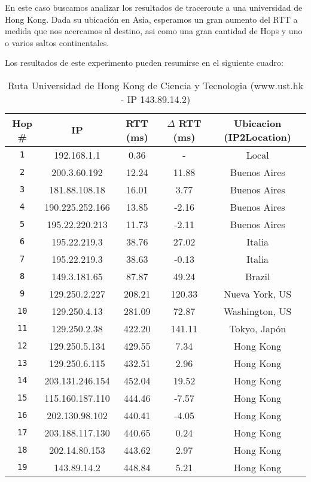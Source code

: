 En este caso buscamos analizar los resultados de traceroute a una universidad de Hong Kong. Dada su ubicación en Asia, esperamos un gran aumento del RTT a medida que nos acercamos al destino, asi como una gran cantidad de Hops y uno o varios saltos continentales.

Los resultados de este experimento pueden resumirse en el siguiente cuadro:

\begin{table}[ht]\begin{center}
    \begin{tabular}{|c|c|c|c|c|}
    \hline
    \textbf{Hop \#} & \textbf{IP} & \textbf{RTT (ms)} & \textbf{$\Delta$ RTT (ms)} & \textbf{Ubicacion (IP2Location)} \\ \hline
    \texttt{1} &  192.168.1.1 & 0.36        &  -        & Local \\ \hline
    \texttt{2} &  200.3.60.192 & 12.24      & 11.88     & Buenos Aires \\ \hline
    \texttt{3} &  181.88.108.18 & 16.01     & 3.77      & Buenos Aires \\ \hline
    \texttt{4} &  190.225.252.166 & 13.85   & -2.16     & Buenos Aires \\ \hline
    \texttt{5} &  195.22.220.213 & 11.73    & -2.11     & Buenos Aires \\ \hline
    \texttt{6} &  195.22.219.3 & 38.76      & 27.02     & Italia \\ \hline
    \texttt{7} &  195.22.219.3 & 38.63      & -0.13     & Italia \\ \hline
    \texttt{8} &  149.3.181.65 & 87.87      & 49.24     & Brazil \\ \hline
    \texttt{9} &  129.250.2.227 & 208.21    & 120.33    & Nueva York, US \\ \hline
    \texttt{10} & 129.250.4.13 & 281.09     & 72.87     & Washington, US \\ \hline
    \texttt{11} & 129.250.2.38 & 422.20     & 141.11    & Tokyo, Japón \\ \hline
    \texttt{12} & 129.250.5.134 & 429.55    & 7.34      & Hong Kong \\ \hline
    \texttt{13} & 129.250.6.115 & 432.51    & 2.96      & Hong Kong \\ \hline
    \texttt{14} & 203.131.246.154 & 452.04  & 19.52     & Hong Kong \\ \hline
    \texttt{15} & 115.160.187.110 & 444.46  & -7.57     & Hong Kong \\ \hline
    \texttt{16} & 202.130.98.102 & 440.41   & -4.05     & Hong Kong \\ \hline
    \texttt{17} & 203.188.117.130 & 440.65  & 0.24      & Hong Kong \\ \hline
    \texttt{18} & 202.14.80.153 & 443.62    & 2.97      & Hong Kong \\ \hline
    \texttt{19} & 143.89.14.2 & 448.84      & 5.21      & Hong Kong \\ \hline
    \end{tabular}
    \caption{Ruta Universidad de Hong Kong de Ciencia y Tecnologia (www.ust.hk  - IP 143.89.14.2)}
\end{center}
\end{table}

